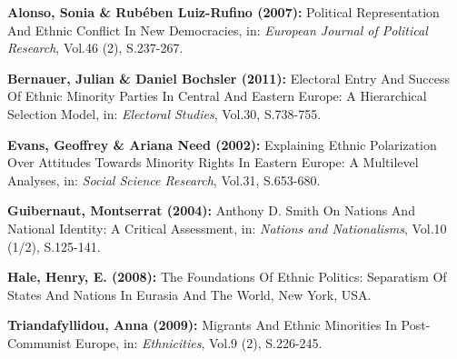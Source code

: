 \begin{compactitem}





\begin{small}



	\item [\Rectsteel] \textbf{Alonso, Sonia \& Rub\'{e}ben Luiz-Rufino (2007):} Political Representation And Ethnic Conflict In New Democracies, in: \textsl{European Journal of Political Research}, Vol.46 (2), S.237-267.


	\item [\Rectsteel] \textbf{Bernauer, Julian \& Daniel Bochsler (2011):} Electoral Entry And Success Of Ethnic Minority Parties In Central And Eastern Europe: A Hierarchical Selection Model, in: \textsl{Electoral Studies}, Vol.30, S.738-755.


	\item [\Rectsteel] \textbf{Evans, Geoffrey \& Ariana Need (2002):} Explaining Ethnic Polarization Over Attitudes Towards Minority Rights In Eastern Europe: A Multilevel Analyses, in: \textsl{Social Science Research}, Vol.31, S.653-680.


	\item [\Rectsteel] \textbf{Guibernaut, Montserrat (2004):} Anthony D. Smith On Nations And National Identity: A Critical Assessment, in: \textsl{Nations and Nationalisms}, Vol.10 (1/2), S.125-141.


	\item [\Rectsteel] \textbf{Hale, Henry, E. (2008):} The Foundations Of Ethnic Politics: Separatism Of States And Nations In Eurasia And The World, New York, USA.

	\item [\Rectsteel] \textbf{Triandafyllidou, Anna (2009):} Migrants And Ethnic Minorities In Post-Communist Europe, in: \textsl{Ethnicities}, Vol.9 (2), S.226-245.


\end{small}



	\end{compactitem}
